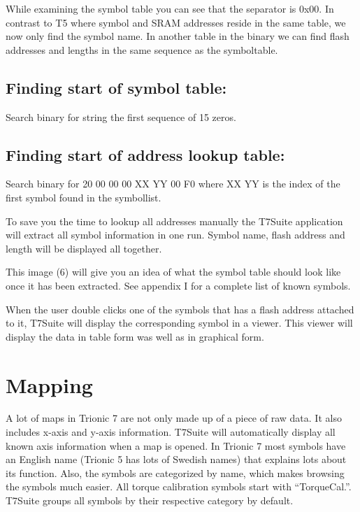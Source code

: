 \documentclass[11pt,a4paper]{book}
\begin{document}
While examining the symbol table you can see that the separator is 0x00. In
contrast to T5 where symbol and SRAM addresses reside in the same table, we now
only find the symbol name. In another table in the binary we can find flash
addresses and lengths in the same sequence as the symboltable.

\section{Finding start of symbol table:}

Search binary for string the first sequence of 15 zeros.
\section{Finding start of address lookup table:}
Search binary for 20 00 00 00 XX YY 00 F0 where XX YY is the index of the first
symbol found in the symbollist.

To save you the time to lookup all addresses manually the T7Suite application
will extract all symbol information in one run. Symbol name, flash address and
length will be displayed all together.

This image (6) will give you an idea of what the symbol table should
look like once it has been extracted. See appendix I for a complete
list of known symbols.
\begin{figure}[]
    \centering
    \missingfigure{}
    \caption{}
    \label{fig:}
\end{figure}

When the user double clicks one of the symbols that has a flash address attached
to it, T7Suite will display the corresponding symbol in a viewer. This viewer
will display the data in table form was well as in graphical form.
\begin{figure}[]
    \centering
    \missingfigure{}
    \caption{}
    \label{fig:}
\end{figure}

\chapter{Mapping}
A lot of maps in Trionic 7 are not only made up of a piece of raw data. It also
includes x-axis and y-axis information. T7Suite will automatically display all
known axis information when a map is opened. In Trionic 7 most symbols have an
English name (Trionic 5 has lots of Swedish names) that explains lots about its
function. Also, the symbols are categorized by name, which makes browsing the
symbols much easier. All torque calibration symbols start with
\enquote{TorqueCal.}. T7Suite groups all symbols by their respective category by
default.
\end{document}
